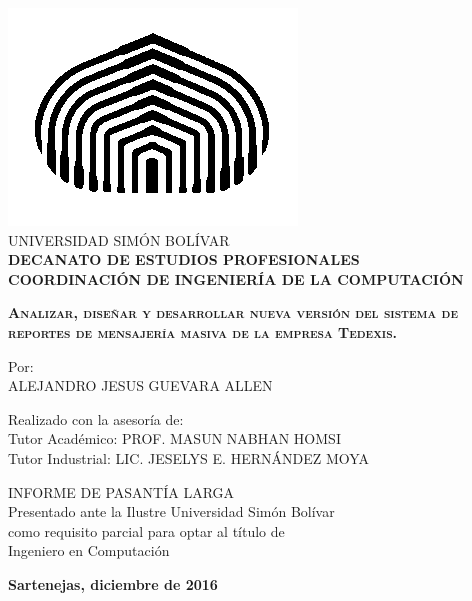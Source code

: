 \begin{titlepage}
\begin{center}

\includegraphics[scale=0.5,type=png,ext=.png,read=.png]{imagenes/cebolla} \\

\textsc {\large UNIVERSIDAD SIMÓN BOLÍVAR} \\
\textsc{\bfseries DECANATO DE ESTUDIOS PROFESIONALES\\
COORDINACIÓN DE INGENIERÍA DE LA COMPUTACIÓN}

\bigskip
\bigskip
\bigskip
\bigskip
\bigskip
\bigskip
\bigskip
\bigskip
\bigskip

\textsc{\bfseries Analizar, diseñar y desarrollar nueva versión del sistema de reportes de mensajería masiva de la empresa Tedexis.}

\bigskip
\bigskip
\bigskip
\bigskip
\bigskip

\begin{minipage}{\textwidth}
\centering
Por: \\ ALEJANDRO JESUS GUEVARA ALLEN \\

\bigskip
\bigskip
\bigskip

Realizado con la asesoría de: \\
Tutor Académico: PROF. MASUN NABHAN HOMSI \\
Tutor Industrial: LIC. JESELYS E. HERNÁNDEZ MOYA
\end{minipage}

\bigskip
\bigskip
\bigskip
\bigskip
\bigskip
\bigskip
\bigskip
\bigskip
\bigskip

{INFORME DE PASANTÍA LARGA \\ Presentado ante la Ilustre Universidad Simón Bolívar \\
como requisito parcial para optar al título de \\ Ingeniero en Computación} \\

\bigskip
\bigskip
\vfill

{\large \bfseries Sartenejas, 
diciembre de 2016}

\end{center}
\end{titlepage}
